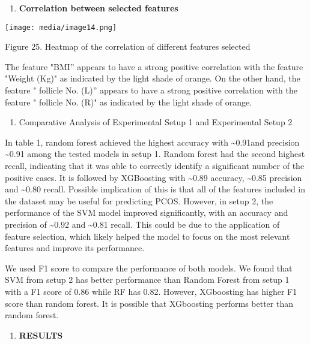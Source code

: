 \documentclass[
]{article}
\begin{document}
\begin{enumerate}
\def\labelenumi{\arabic{enumi}.}
\setcounter{enumi}{1}
\item
  \textbf{Correlation between selected features}
\end{enumerate}

\texttt{[image: media/image14.png]}

Figure 25. Heatmap of the correlation of different features selected

The feature "BMI'' appears to have a strong positive correlation with
the feature "Weight (Kg)" as indicated by the light shade of orange. On
the other hand, the feature " follicle No. (L)'' appears to have a
strong positive correlation with the feature " follicle No. (R)" as
indicated by the light shade of orange.

\begin{enumerate}
\def\labelenumi{\arabic{enumi}.}
\setcounter{enumi}{4}
\item
  Comparative Analysis of Experimental Setup 1 and Experimental Setup 2
\end{enumerate}

In table 1, random forest achieved the highest accuracy with
\textasciitilde0.91and precision \textasciitilde0.91 among the tested
models in setup 1. Random forest had the second highest recall,
indicating that it was able to correctly identify a significant number
of the positive cases. It is followed by XGBoosting with
\textasciitilde0.89 accuracy, \textasciitilde0.85 precision and
\textasciitilde0.80 recall. Possible implication of this is that all of
the features included in the dataset may be useful for predicting PCOS.
However, in setup 2, the performance of the SVM model improved
significantly, with an accuracy and precision of \textasciitilde0.92 and
\textasciitilde0.81 recall. This could be due to the application of
feature selection, which likely helped the model to focus on the most
relevant features and improve its performance.

We used F1 score to compare the performance of both models. We found
that SVM from setup 2 has better performance than Random Forest from
setup 1 with a F1 score of 0.86 while RF has 0.82. However, XGboosting
has higher F1 score than random forest. It is possible that XGboosting
performs better than random forest.

\begin{enumerate}
\def\labelenumi{\Roman{enumi}.}
\setcounter{enumi}{2}
\item
  \textbf{RESULTS}
\end{enumerate}
\end{document}
